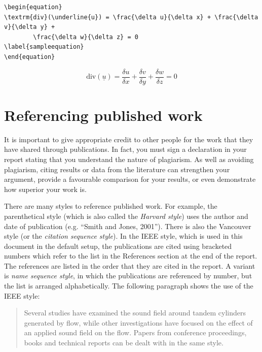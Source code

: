 {\footnotesize
\begin{verbatim}
\begin{equation}
\textrm{div}(\underline{u}) = \frac{\delta u}{\delta x} + \frac{\delta v}{\delta y} +
        \frac{\delta w}{\delta z} = 0
\label{sampleequation}
\end{equation} 
\end{verbatim}
}

\begin{equation}
\textrm{div}(\underline{u}) = \frac{\delta u}{\delta x} + \frac{\delta v}{\delta y} + \frac{\delta w}{\delta z} = 0
\label{sampleequation}
\end{equation} 

\section{Referencing published work}
It is important to give appropriate credit to other people for the work that they have shared through publications. In fact, you must sign a declaration in your report stating that you understand the nature of plagiarism. As well as avoiding plagiarism, citing results or data from the literature can strengthen your argument, provide a favourable comparison for your results, or even demonstrate how superior your work is.

There are many styles to reference published work. For example, the parenthetical style (which is also called the \emph{Harvard style}) uses the author and date of publication (e.g. ``Smith and Jones, 2001''). There is also the Vancouver style (or the \emph{citation sequence style}). In the IEEE style, which is used in this document in the default setup, the publications are cited using bracketed numbers which refer to the list in the References section at the end of the report. The references are listed in the order that they are cited in the report. A variant is \emph{name sequence style}, in which the publications are referenced by number, but the list is arranged alphabetically. The following paragraph shows the use of the IEEE style: 

\begin{quote}
Several studies have examined the sound field around tandem cylinders generated by flow\cite{fitzpatrick2003flow,finnegan2010experimental}, while other investigations have focused on the effect of an applied sound field on the flow\cite{hall2003vortex}. Papers from conference proceedings\cite{jordan2001array}, books\cite{paidoussis2010fluid} and technical reports\cite{reyes2007power} can be dealt with in the same style.
\end{quote}

